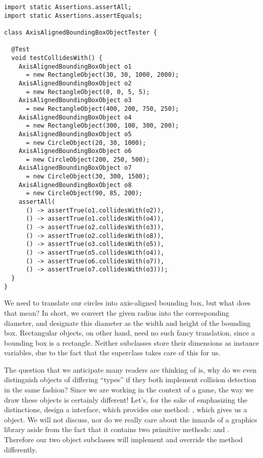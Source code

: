 \begin{lstlisting}[language=MyJava]
import static Assertions.assertAll;
import static Assertions.assertEquals;

class AxisAlignedBoundingBoxObjectTester {

  @Test
  void testCollidesWith() {
    AxisAlignedBoundingBoxObject o1 
      = new RectangleObject(30, 30, 1000, 2000);
    AxisAlignedBoundingBoxObject o2 
      = new RectangleObject(0, 0, 5, 5);
    AxisAlignedBoundingBoxObject o3 
      = new RectangleObject(400, 200, 750, 250);
    AxisAlignedBoundingBoxObject o4 
      = new RectangleObject(300, 100, 300, 200);
    AxisAlignedBoundingBoxObject o5 
      = new CircleObject(20, 30, 1000);
    AxisAlignedBoundingBoxObject o6 
      = new CircleObject(200, 250, 500);
    AxisAlignedBoundingBoxObject o7 
      = new CircleObject(30, 300, 1500);
    AxisAlignedBoundingBoxObject o8 
      = new CircleObject(90, 85, 200);
    assertAll(
      () -> assertTrue(o1.collidesWith(o2)),
      () -> assertTrue(o1.collidesWith(o4)),
      () -> assertTrue(o2.collidesWith(o3)),
      () -> assertTrue(o2.collidesWith(o8)),
      () -> assertTrue(o3.collidesWith(o5)),
      () -> assertTrue(o5.collidesWith(o4)),
      () -> assertTrue(o6.collidesWith(o7)),
      () -> assertTrue(o7.collidesWith(o3)));
  }
}
\end{lstlisting}

We need to translate our circles into axis-aligned bounding box, but what does that mean? In short, we convert the given radius into the corresponding diameter, and designate this diameter as the width and height of the bounding box. Rectangular objects, on other hand, need no such fancy translation, since a bounding box is a rectangle. Neither subclasses store their dimensions as instance variables, due to the fact that the superclass takes care of this for us.

The question that we anticipate many readers are thinking of is, why do we even distinguish objects of differing ``types'' if they both implement collision detection in the same fashion? Since we are working in the context of a game, the way we draw these objects is certainly different! Let's, for the sake of emphasizing the distinctions, design a  interface, which provides one method: , which gives us a  object. We will not discuss, nor do we really care about the innards of a graphics library aside from the fact that it contains two primitive methods:  and . Therefore our two object subclasses will implement  and override the method differently.

